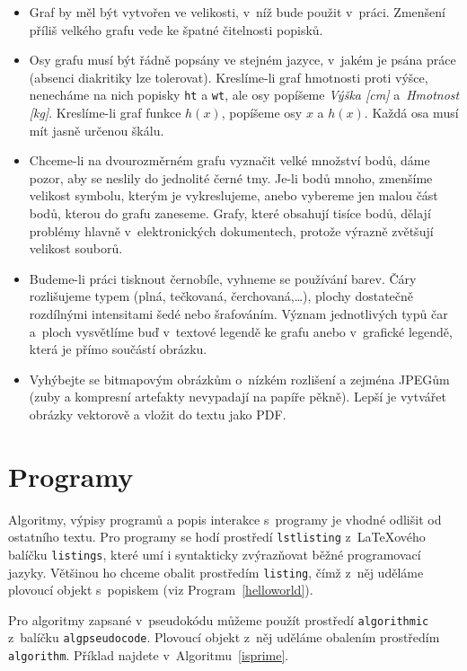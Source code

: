 \begin{itemize}
\item Graf by měl být vytvořen ve velikosti, v~níž bude použit
  v~práci. Zmenšení příliš velkého grafu vede ke špatné čitelnosti
  popisků.
\item Osy grafu musí být řádně popsány ve stejném jazyce, v~jakém je
  psána práce (absenci diakritiky lze tolerovat). Kreslíme-li graf
  hmotnosti proti výšce, nenecháme na nich popisky \texttt{ht} a
  \texttt{wt}, ale osy popíšeme \emph{Výška [cm]} a~\emph{Hmotnost
    [kg]}. Kreslíme-li graf funkce $h(x)$, popíšeme osy $x$ a $h(x)$.
  Každá osa musí mít jasně určenou škálu.
\item Chceme-li na dvourozměrném grafu vyznačit velké množství bodů,
  dáme pozor, aby se neslily do jednolité černé tmy. Je-li bodů mnoho,
  zmenšíme velikost symbolu, kterým je vykreslujeme, anebo vybereme
  jen malou část bodů, kterou do grafu zaneseme. Grafy, které obsahují
  tisíce bodů, dělají problémy hlavně v~elektronických dokumentech,
  protože výrazně zvětšují velikost souborů.
\item Budeme-li práci tisknout černobíle, vyhneme se používání barev.
  Čáry roz\-li\-šu\-je\-me typem (plná, tečkovaná, čerchovaná,\ldots), plochy
  dostatečně roz\-díl\-ný\-mi intensitami šedé nebo šrafováním. Význam
  jednotlivých typů čar a~ploch vysvětlíme buď v~textové legendě ke
  grafu anebo v~grafické legendě, která je přímo součástí obrázku.
\item Vyhýbejte se bitmapovým obrázkům o~nízkém rozlišení a zejména
  JPEGům (zuby a kompresní artefakty nevypadají na papíře pěkně).
  Lepší je vytvářet obrázky vektorově a vložit do textu jako PDF.
\end{itemize}

\section{Programy}

Algoritmy, výpisy programů a popis interakce s~programy je vhodné
odlišit od ostatního textu. Pro programy se hodí prostředí \texttt{lstlisting}
z~\LaTeX{}ového balíčku \texttt{listings}, které umí i syntakticky zvýrazňovat
běžné programovací jazyky. Většinou ho chceme obalit prostředím \texttt{listing},
čímž z~něj uděláme plovoucí objekt s~popiskem (viz Program~\ref{helloworld}).

Pro algoritmy zapsané v~pseudokódu můžeme použít prostředí \texttt{algorithmic}
z~balíčku \texttt{algpseudocode}. Plovoucí objekt z~něj uděláme obalením prostředím
\texttt{algorithm}. Příklad najdete v~Algoritmu~\ref{isprime}.

